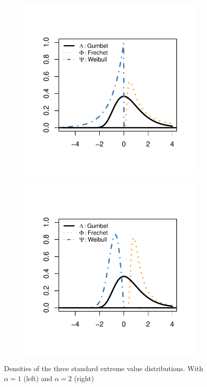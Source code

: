 \begin{figure}[h!]
\centering
	\begin{subfigure}[h]{0.49\linewidth}
\includegraphics[width=\textwidth]{./plots/chapter2_plots/densities1.pdf}
\end{subfigure}
			\begin{subfigure}[h]{0.49\linewidth}
\includegraphics[width=\textwidth]{./plots/chapter2_plots/densities2.pdf}
\end{subfigure}
\caption{Densities of the three standard extreme value distributions. With $\alpha = 1$ (left) and $\alpha = 2$ (right)}
\label{fig:my_label}
\end{figure}


